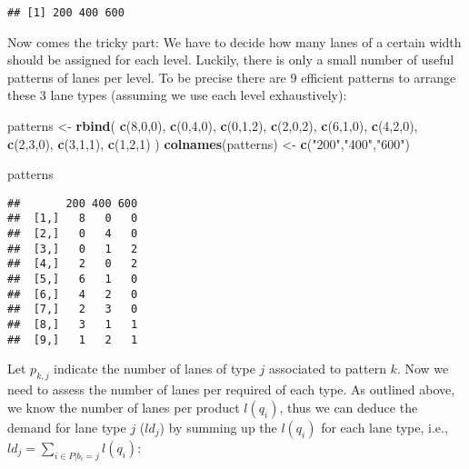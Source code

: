 \documentclass[
]{article}
\newenvironment{Shaded}{\begin{snugshade}}{\end{snugshade}}
\newcommand{\DecValTok}[1]{\textcolor[rgb]{0.00,0.00,0.81}{#1}}
\newcommand{\KeywordTok}[1]{\textcolor[rgb]{0.13,0.29,0.53}{\textbf{#1}}}
\newcommand{\NormalTok}[1]{#1}
\newcommand{\StringTok}[1]{\textcolor[rgb]{0.31,0.60,0.02}{#1}}
\begin{document}
\begin{verbatim}
## [1] 200 400 600
\end{verbatim}

Now comes the tricky part: We have to decide how many lanes of a certain
width should be assigned for each level. Luckily, there is only a small
number of useful patterns of lanes per level. To be precise there are 9
efficient patterns to arrange these 3 lane types (assuming we use each
level exhaustively):

\begin{Shaded}
\begin{Highlighting}[]
\NormalTok{patterns <-}\StringTok{ }\KeywordTok{rbind}\NormalTok{(}
\KeywordTok{c}\NormalTok{(}\DecValTok{8}\NormalTok{,}\DecValTok{0}\NormalTok{,}\DecValTok{0}\NormalTok{),}
\KeywordTok{c}\NormalTok{(}\DecValTok{0}\NormalTok{,}\DecValTok{4}\NormalTok{,}\DecValTok{0}\NormalTok{),}
\KeywordTok{c}\NormalTok{(}\DecValTok{0}\NormalTok{,}\DecValTok{1}\NormalTok{,}\DecValTok{2}\NormalTok{),}
\KeywordTok{c}\NormalTok{(}\DecValTok{2}\NormalTok{,}\DecValTok{0}\NormalTok{,}\DecValTok{2}\NormalTok{),}
\KeywordTok{c}\NormalTok{(}\DecValTok{6}\NormalTok{,}\DecValTok{1}\NormalTok{,}\DecValTok{0}\NormalTok{),}
\KeywordTok{c}\NormalTok{(}\DecValTok{4}\NormalTok{,}\DecValTok{2}\NormalTok{,}\DecValTok{0}\NormalTok{),}
\KeywordTok{c}\NormalTok{(}\DecValTok{2}\NormalTok{,}\DecValTok{3}\NormalTok{,}\DecValTok{0}\NormalTok{),}
\KeywordTok{c}\NormalTok{(}\DecValTok{3}\NormalTok{,}\DecValTok{1}\NormalTok{,}\DecValTok{1}\NormalTok{),}
\KeywordTok{c}\NormalTok{(}\DecValTok{1}\NormalTok{,}\DecValTok{2}\NormalTok{,}\DecValTok{1}\NormalTok{)}
\NormalTok{)}
\KeywordTok{colnames}\NormalTok{(patterns) <-}\StringTok{ }\KeywordTok{c}\NormalTok{(}\StringTok{"200"}\NormalTok{,}\StringTok{"400"}\NormalTok{,}\StringTok{"600"}\NormalTok{)}

\NormalTok{patterns}
\end{Highlighting}
\end{Shaded}

\begin{verbatim}
##       200 400 600
##  [1,]   8   0   0
##  [2,]   0   4   0
##  [3,]   0   1   2
##  [4,]   2   0   2
##  [5,]   6   1   0
##  [6,]   4   2   0
##  [7,]   2   3   0
##  [8,]   3   1   1
##  [9,]   1   2   1
\end{verbatim}

Let \(p_{k,j}\) indicate the number of lanes of type \(j\) associated to
pattern \(k\). Now we need to assess the number of lanes per required of
each type. As outlined above, we know the number of lanes per product
\(l(q_i)\), thus we can deduce the demand for lane type \(j\) (\(ld_j\))
by summing up the \(l(q_i)\) for each lane type, i.e.,
\(ld_j = \sum_{i \in P|b_i=j} l(q_i)\):
\end{document}
